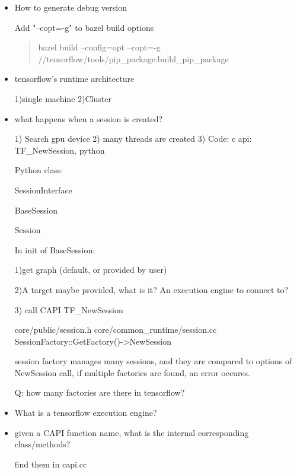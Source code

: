 \documentclass[10pt,a4paper]{book}
\begin{document}
\begin{itemize}
	\item How to generate debug version
	
	Add "--copt=-g" to bazel build options
	
	\begin{quote}
		bazel build --config=opt --copt=-g //tensorflow/tools/pip\_package:build\_pip\_package
	\end{quote}


	\item tensorflow's runtime architecture
	
	1)single machine
	2)Cluster
	

	\item what happens when a session is created?
	
	1) Search gpu device
	2) many threads are created
	3) Code: 
	  c api: TF\_NewSession, python

	Python class:
	
	SessionInterface 
	
	BaseSession 
	
	Session

	In init of BaseSession:
	
	1)get graph (default, or provided by user)
	
	2)A target maybe provided, what is it? An execution engine to connect to?
	
	3) call CAPI TF\_NewSession
	
	core/public/session.h
	core/common\_runtime/session.cc
	SessionFactory::GetFactory()->NewSession
	
	session factory manages many sessions, and they are compared to options of NewSession call, 
	if multiple factories are found, an error occures.
	
	Q: how many factories are there in tensorflow?

	\item What is a tensorflow execution engine?
	
	\item given a CAPI function name, what is the internal corresponding class/methods?
	
	find them in capi.cc
\end{itemize}
\end{document}
